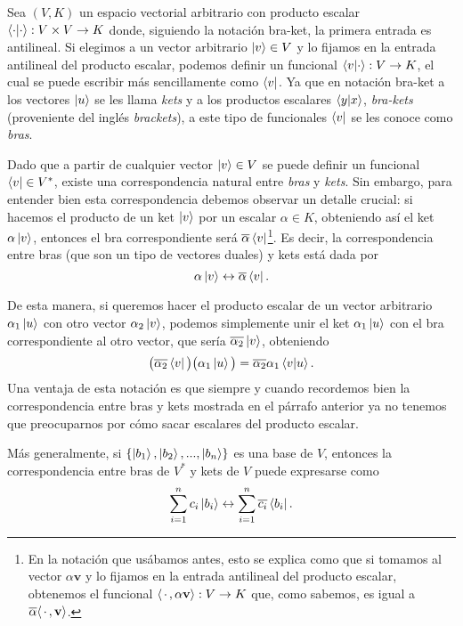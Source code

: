 \documentclass[12pt,dvipsnames]{article}
\begin{document}
Sea $(V,K)$ un espacio vectorial arbitrario con producto escalar $\braket{\cdot|\cdot}:V\times V\to K$ donde, siguiendo la notación bra-ket, la primera entrada es antilineal. Si elegimos a un vector arbitrario $\ket{v}\in V$ y lo fijamos en la entrada antilineal del producto escalar, podemos definir un funcional $\braket{v|\cdot}:V\to K$, el cual se puede escribir más sencillamente como $\bra{v}$. Ya que en notación bra-ket a los vectores $\ket{u}$ se les llama \emph{kets} y a los productos escalares $\braket{y|x}$, \emph{bra-kets} (proveniente del inglés \emph{brackets}), a este tipo de funcionales $\bra{v}$ se les conoce como \emph{bras}.

Dado que a partir de cualquier vector $\ket{v}\in V$ se puede definir un funcional $\bra{v}\in V^*$, existe una correspondencia natural entre \emph{bras} y \emph{kets}. Sin embargo, para entender bien esta correspondencia debemos observar un detalle crucial: si hacemos el producto de un ket $\ket{v}$ por un escalar $\alpha\in K$, obteniendo así el ket $\alpha\ket{v}$, entonces el bra correspondiente será $\overline{\alpha}\bra{v}$\footnote{En la notación que usábamos antes, esto se explica como que si tomamos al vector $\alpha\mathbf{v}$ y lo fijamos en la entrada antilineal del producto escalar, obtenemos el funcional $\langle\hspace{0.5mm}\cdot\hspace{0.5mm} , \alpha\mathbf{v}\rangle:V\to K$ que, como sabemos, es igual a $\overline{\alpha}\langle\hspace{0.5mm} \cdot\hspace{0.5mm} ,\mathbf{v}\rangle$.}. Es decir, la correspondencia entre bras (que son un tipo de vectores duales) y kets está dada por \[
    \alpha\ket{v} \leftrightarrow \overline{\alpha}\bra{v}
.\] 

De esta manera, si queremos hacer el producto escalar de un vector arbitrario $\alpha_1 \ket{u}$ con otro vector $\alpha_2 \ket{v}$, podemos simplemente unir el ket $\alpha_1 \ket{u}$ con el bra correspondiente al otro vector, que sería $\overline{\alpha_2}\ket{v}$, obteniendo \[
    \big(\overline{\alpha_2}\bra{v}\big)\big(\alpha_1\ket{u}\big) = \overline{\alpha_2}\alpha_1\braket{v|u}
.\] Una ventaja de esta notación es que \textemdash siempre y cuando recordemos bien la correspondencia entre bras y kets mostrada en el párrafo anterior\textemdash\hspace{0.5mm} ya no tenemos que preocuparnos por cómo sacar escalares del producto escalar.

Más generalmente, si $\{\ket{b_1},\ket{b_2},...,\ket{b_n}\}$ es una base de $V$, entonces la correspondencia entre bras de $V^*$ y kets de $V$ puede expresarse como \[
    \sum_{i=1}^n c_i \ket{b_i} \leftrightarrow \sum_{i=1}^n \overline{c_i}\bra{b_i}
.\]    
\end{document}
